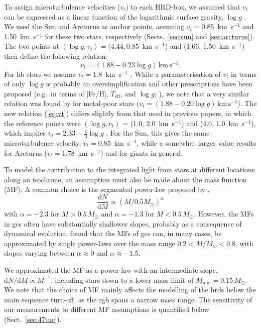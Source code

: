 \documentclass{aa}
\begin{document}
To assign microturbulence velocities ($v_t$) to each HRD-box, we assumed that $v_t$ can be expressed as a linear function of the logarithmic surface gravity, $\log g$ \citep{McWilliam2008,Colucci2009,Larsen2012a,Sakari2013}.
We used the Sun and Arcturus as anchor points, assuming $v_t=0.85$~km~s$^{-1}$ and 1.50~km~s$^{-1}$ for these two stars, respectively (Sects.~\ref{sec:sun} and \ref{sec:arcturus}). The two points at 
$(\log g, v_t) = (4.44, 0.85$~km~s$^{-1}$) 
and
(1.66, 1.50~km~s$^{-1}$)  
then define the following relation:
%
\begin{equation}
v_t = (1.88 - 0.23 \log g)\, \mathrm{km} \, \mathrm{s}^{-1} .
\label{eq:vt}
\end{equation}
%
For \ac{hb} stars we assume $v_t = 1.8$~km~s$^{-1}$ \citep{Pilachowski1996}.
While a parameterisation of $v_t$ in terms of only $\log g$ is probably an oversimplification and other prescriptions have been proposed (e.g.\ in terms of [Fe/H], $T_\mathrm{eff}$, and $\log g$; \citealt{Mashonkina2017a}), we note that a very similar relation was found by \citet{Roederer2014} for metal-poor stars ($v_t = (1.88 -0.20 \log g) \, \mathrm{km} \, \mathrm{s}^{-1} $). The new relation (\ref{eq:vt}) differs slightly from that used in previous papers, in which the reference points were $(\log g, v_t)$ = (1.0, 2.0~km~s$^{-1}$) and (4.0, 1.0~km~s$^{-1}$), which implies $v_t = 2.33 - \frac{1}{3} \log g$ \citep{Larsen2012a}. For the Sun, this gives the same microturbulence velocity, $v_t = 0.85$~km~s$^{-1}$, while a somewhat larger value results for Arcturus ($v_t = 1.78$~km~s$^{-1}$) and for giants in general. 

To model the contribution to the integrated light from stars at different locations along an isochrone, an assumption must also be made about the mass function (MF). A common choice is the segmented power-law  proposed by \citet{Kroupa2001}, 
%
\begin{equation}
\frac{\mathrm{d}N}{\mathrm{d}M} \propto (M / 0.5 M_\odot)^{\alpha}
\end{equation}
%
with $\alpha=-2.3$ for $M>0.5 \, M_\odot$ and $\alpha=-1.3$ for $M<0.5 \, M_\odot$.
However, the MFs in \acp{gc} often have substantially shallower slopes, probably as a consequence of dynamical evolution.  \citet{Sollima2017} found that the MFs of \acp{gc} can, in many cases, be approximated by single power-laws over the mass range $0.2 < M/M_\odot < 0.8$, with slopes varying between $\alpha\approx0$ and $\alpha\approx-1.5$. 

We approximated the MF as a power-law with an intermediate slope, $\mathrm{d}N/\mathrm{d}M \propto M^{-1}$, including stars down to a lower mass limit of $M_\mathrm{min} = 0.15 \, M_\odot$. We note that the choice of MF mainly affects the modelling of the \acp{hrd} below the main sequence turn-off, as the \ac{rgb} spans a narrow mass range. 
The sensitivity of our measurements to different MF assumptions is quantified below (Sect.~\ref{sec:47tuc}). 
\end{document}
